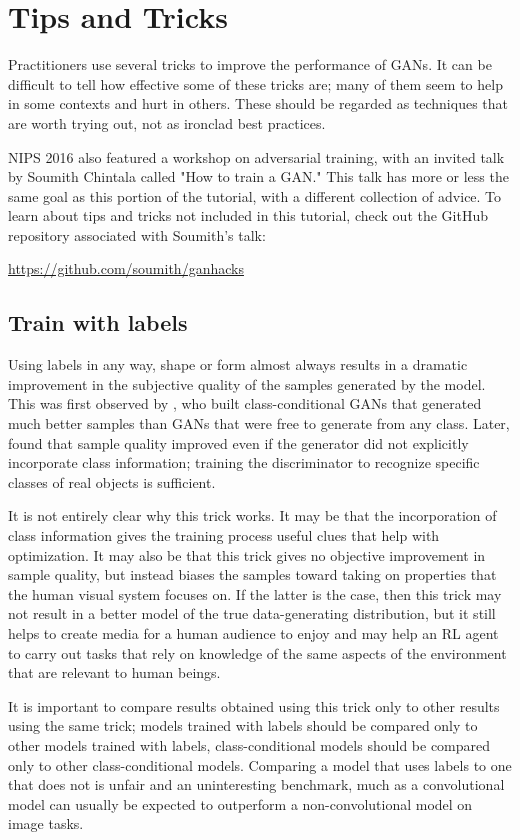 \section{Tips and Tricks}

Practitioners use several tricks to improve the performance of GANs.
It can be difficult to tell how effective some of these tricks are;
many of them seem to help in some contexts and hurt in others.
These should be regarded as techniques that are worth trying out,
not as ironclad best practices.

NIPS 2016 also featured a workshop on adversarial training, with
an invited talk by Soumith Chintala called "How to train a GAN."
This talk has more or less the same goal as this portion of the tutorial,
with a different collection of advice.
To learn about tips and tricks not included in this tutorial, check
out the GitHub repository associated with Soumith's talk:

\url{https://github.com/soumith/ganhacks}


\subsection{Train with labels}

Using labels in any way, shape or form almost always results in a dramatic
improvement in the subjective quality of the samples generated by the model.
This was first observed by \citet{denton2015deep}, who built class-conditional
GANs that generated much better samples than GANs that were free to generate
from any class.
Later, \citet{Salimans-et-al-arxiv2014} found that sample quality improved
even if the generator did not explicitly incorporate class information; training
 the discriminator to recognize specific classes of real objects is sufficient.

 It is not entirely clear why this trick works.
 It may be that the incorporation of class information gives the training
 process useful clues that help with optimization.
 It may also be that this trick gives no objective improvement in sample quality,
 but instead biases the samples toward taking on properties that the human
 visual system focuses on.
 If the latter is the case, then this trick may not result in a better model
 of the true data-generating distribution, but it still helps to create media
 for a human audience to enjoy and may help an RL agent to carry out tasks
 that rely on knowledge of the same aspects of the environment that are relevant
 to human beings.

 It is important to compare results obtained using this trick only to other
 results using the same trick; models trained with labels should be compared
 only to other models trained with labels, class-conditional models should
 be compared only to other class-conditional models.
 Comparing a model that uses labels to one that does not is unfair and an
 uninteresting benchmark, much as a convolutional model can usually be expected
 to outperform a non-convolutional model on image tasks.


